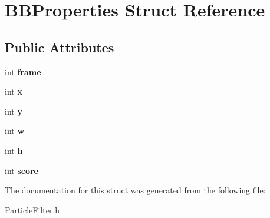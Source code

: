\hypertarget{structBBProperties}{\section{B\-B\-Properties Struct Reference}
\label{structBBProperties}
}
\subsection*{Public Attributes}
\begin{DoxyCompactItemize}
\item 
\hypertarget{structBBProperties_aedfde5d5efc74aa0c33ebb582bf5860d}{int {\bfseries frame}}\label{structBBProperties_aedfde5d5efc74aa0c33ebb582bf5860d}

\item 
\hypertarget{structBBProperties_ad3706956318aa6bce85b1ea1fc023773}{int {\bfseries x}}\label{structBBProperties_ad3706956318aa6bce85b1ea1fc023773}

\item 
\hypertarget{structBBProperties_a3ca17cb30da0fd9ca7f49743aec1aacf}{int {\bfseries y}}\label{structBBProperties_a3ca17cb30da0fd9ca7f49743aec1aacf}

\item 
\hypertarget{structBBProperties_a70041024b5ed72c046765b8752b1ae62}{int {\bfseries w}}\label{structBBProperties_a70041024b5ed72c046765b8752b1ae62}

\item 
\hypertarget{structBBProperties_aa833d89e41fa31420ac8068bb11afa64}{int {\bfseries h}}\label{structBBProperties_aa833d89e41fa31420ac8068bb11afa64}

\item 
\hypertarget{structBBProperties_acd9d18b507235ca1872c1580cf1f146b}{int {\bfseries score}}\label{structBBProperties_acd9d18b507235ca1872c1580cf1f146b}

\end{DoxyCompactItemize}


The documentation for this struct was generated from the following file\-:\begin{DoxyCompactItemize}
\item 
Particle\-Filter.\-h\end{DoxyCompactItemize}
